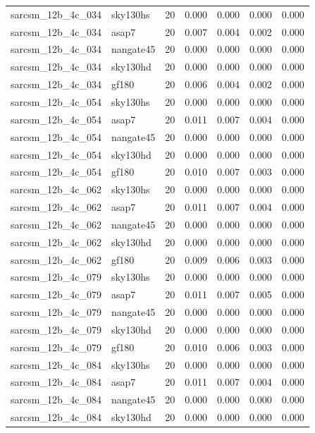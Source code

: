 \begin{tabular}{llrrrrr}
sarcsm\_12b\_4c\_034 & sky130hs & 20 & 0.000 & 0.000 & 0.000 & 0.000 \\
sarcsm\_12b\_4c\_034 & asap7 & 20 & 0.007 & 0.004 & 0.002 & 0.000 \\
sarcsm\_12b\_4c\_034 & nangate45 & 20 & 0.000 & 0.000 & 0.000 & 0.000 \\
sarcsm\_12b\_4c\_034 & sky130hd & 20 & 0.000 & 0.000 & 0.000 & 0.000 \\
sarcsm\_12b\_4c\_034 & gf180 & 20 & 0.006 & 0.004 & 0.002 & 0.000 \\
sarcsm\_12b\_4c\_054 & sky130hs & 20 & 0.000 & 0.000 & 0.000 & 0.000 \\
sarcsm\_12b\_4c\_054 & asap7 & 20 & 0.011 & 0.007 & 0.004 & 0.000 \\
sarcsm\_12b\_4c\_054 & nangate45 & 20 & 0.000 & 0.000 & 0.000 & 0.000 \\
sarcsm\_12b\_4c\_054 & sky130hd & 20 & 0.000 & 0.000 & 0.000 & 0.000 \\
sarcsm\_12b\_4c\_054 & gf180 & 20 & 0.010 & 0.007 & 0.003 & 0.000 \\
sarcsm\_12b\_4c\_062 & sky130hs & 20 & 0.000 & 0.000 & 0.000 & 0.000 \\
sarcsm\_12b\_4c\_062 & asap7 & 20 & 0.011 & 0.007 & 0.004 & 0.000 \\
sarcsm\_12b\_4c\_062 & nangate45 & 20 & 0.000 & 0.000 & 0.000 & 0.000 \\
sarcsm\_12b\_4c\_062 & sky130hd & 20 & 0.000 & 0.000 & 0.000 & 0.000 \\
sarcsm\_12b\_4c\_062 & gf180 & 20 & 0.009 & 0.006 & 0.003 & 0.000 \\
sarcsm\_12b\_4c\_079 & sky130hs & 20 & 0.000 & 0.000 & 0.000 & 0.000 \\
sarcsm\_12b\_4c\_079 & asap7 & 20 & 0.011 & 0.007 & 0.005 & 0.000 \\
sarcsm\_12b\_4c\_079 & nangate45 & 20 & 0.000 & 0.000 & 0.000 & 0.000 \\
sarcsm\_12b\_4c\_079 & sky130hd & 20 & 0.000 & 0.000 & 0.000 & 0.000 \\
sarcsm\_12b\_4c\_079 & gf180 & 20 & 0.010 & 0.006 & 0.003 & 0.000 \\
sarcsm\_12b\_4c\_084 & sky130hs & 20 & 0.000 & 0.000 & 0.000 & 0.000 \\
sarcsm\_12b\_4c\_084 & asap7 & 20 & 0.011 & 0.007 & 0.004 & 0.000 \\
sarcsm\_12b\_4c\_084 & nangate45 & 20 & 0.000 & 0.000 & 0.000 & 0.000 \\
sarcsm\_12b\_4c\_084 & sky130hd & 20 & 0.000 & 0.000 & 0.000 & 0.000 \\

\end{tabular}
